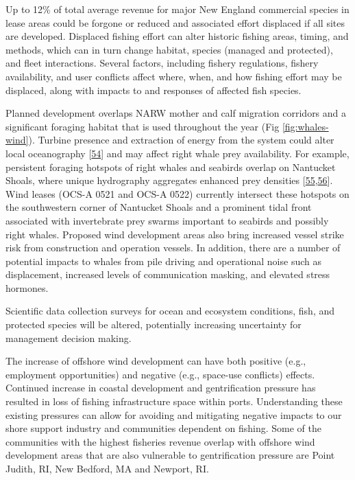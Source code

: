 \documentclass[
  10pt,
]{article}
\begin{document}
Up to 12\% of total average revenue for major New England commercial species in lease areas could be forgone or reduced and associated effort displaced if all sites are developed. Displaced fishing effort can alter historic fishing areas, timing, and methods, which can in turn change habitat, species (managed and protected), and fleet interactions. Several factors, including fishery regulations, fishery availability, and user conflicts affect where, when, and how fishing effort may be displaced, along with impacts to and responses of affected fish species.

Planned development overlaps NARW mother and calf migration corridors and a significant foraging habitat that is used throughout the year (Fig \ref{fig:whales-wind}). Turbine presence and extraction of energy from the system could alter local oceanography {[}\protect\hyperlink{ref-christiansen_wind_2022}{54}{]} and may affect right whale prey availability. For example, persistent foraging hotspots of right whales and seabirds overlap on Nantucket Shoals, where unique hydrography aggregates enhanced prey densities {[}\protect\hyperlink{ref-white_ducks_2020}{55},\protect\hyperlink{ref-sorochan_narw_forage_2021}{56}{]}. Wind leases (OCS-A 0521 and OCS-A 0522) currently intersect these hotspots on the southwestern corner of Nantucket Shoals and a prominent tidal front associated with invertebrate prey swarms important to seabirds and possibly right whales. Proposed wind development areas also bring increased vessel strike risk from construction and operation vessels. In addition, there are a number of potential impacts to whales from pile driving and operational noise such as displacement, increased levels of communication masking, and elevated stress hormones.

Scientific data collection surveys for ocean and ecosystem conditions, fish, and protected species will be altered, potentially increasing uncertainty for management decision making.

The increase of offshore wind development can have both positive (e.g., employment opportunities) and negative (e.g., space-use conflicts) effects. Continued increase in coastal development and gentrification pressure has resulted in loss of fishing infrastructure space within ports. Understanding these existing pressures can allow for avoiding and mitigating negative impacts to our shore support industry and communities dependent on fishing. Some of the communities with the highest fisheries revenue overlap with offshore wind development areas that are also vulnerable to gentrification pressure are Point Judith, RI, New Bedford, MA and Newport, RI.
\end{document}
